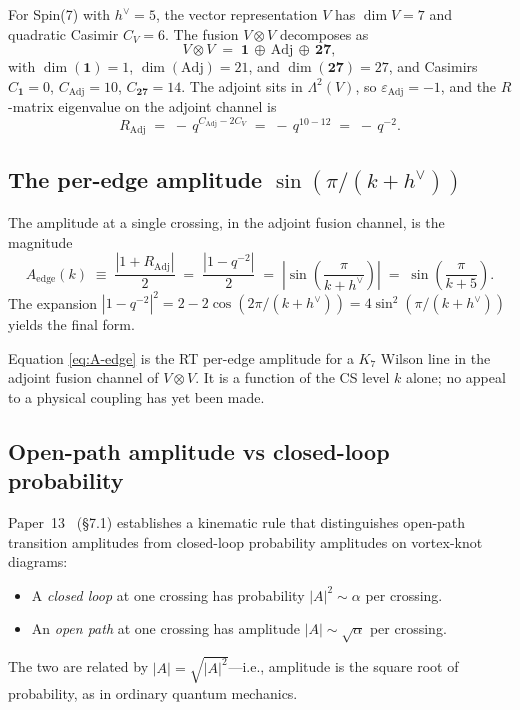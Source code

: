 \documentclass[11pt]{article}
\newcommand{\Adj}{\mathrm{Adj}}
\newcommand{\hv}{h^{\vee}}
\begin{document}
For Spin(7) with $\hv = 5$, the vector representation $V$ has
$\dim V = 7$ and quadratic Casimir $C_V = 6$.  The fusion
$V \otimes V$ decomposes as
\begin{equation}
  V \otimes V \;=\; \mathbf{1} \,\oplus\, \Adj \,\oplus\, \mathbf{27},
\end{equation}
with $\dim(\mathbf{1}) = 1$, $\dim(\Adj) = 21$, and
$\dim(\mathbf{27}) = 27$, and Casimirs
$C_{\mathbf{1}} = 0$, $C_{\Adj} = 10$, $C_{\mathbf{27}} = 14$.
The adjoint sits in $\Lambda^2(V)$, so $\varepsilon_{\Adj} = -1$,
and the $R$-matrix eigenvalue on the adjoint channel is
\begin{equation}
  R_{\Adj} \;=\; -\, q^{C_{\Adj} - 2 C_V}
              \;=\; -\, q^{10 - 12}
              \;=\; -\, q^{-2}.
  \label{eq:R-adj}
\end{equation}

\subsection{The per-edge amplitude $\sin(\pi/(k + \hv))$}
\label{sec:per-edge-amp}

The amplitude at a single crossing, in the adjoint fusion channel,
is the magnitude
\begin{equation}
  A_{\mathrm{edge}}(k)
  \;\equiv\; \frac{|1 + R_{\Adj}|}{2}
  \;=\; \frac{|1 - q^{-2}|}{2}
  \;=\; \left|\sin\!\left(\frac{\pi}{k + \hv}\right)\right|
  \;=\; \sin\!\left(\frac{\pi}{k + 5}\right).
  \label{eq:A-edge}
\end{equation}
The expansion
$|1 - q^{-2}|^2 = 2 - 2\cos(2\pi/(k+\hv)) = 4\sin^2(\pi/(k+\hv))$
yields the final form.

Equation \eqref{eq:A-edge} is the RT per-edge amplitude for a
$K_7$ Wilson line in the adjoint fusion channel of
$V \otimes V$.  It is a function of the CS level $k$ alone; no
appeal to a physical coupling has yet been made.

\subsection{Open-path amplitude vs closed-loop probability}
\label{sec:k7-open-vs-closed}

Paper~13~\cite{paper13} (\S7.1) establishes a kinematic rule that
distinguishes
open-path transition amplitudes from closed-loop probability
amplitudes on vortex-knot diagrams:
\begin{itemize}
\item A \emph{closed loop} at one crossing has probability
  $|A|^2 \sim \alpha$ per crossing.
\item An \emph{open path} at one crossing has amplitude
  $|A| \sim \sqrt{\alpha}$ per crossing.
\end{itemize}
The two are related by $|A| = \sqrt{|A|^2}$---i.e., amplitude is
the square root of probability, as in ordinary quantum mechanics.
\end{document}
